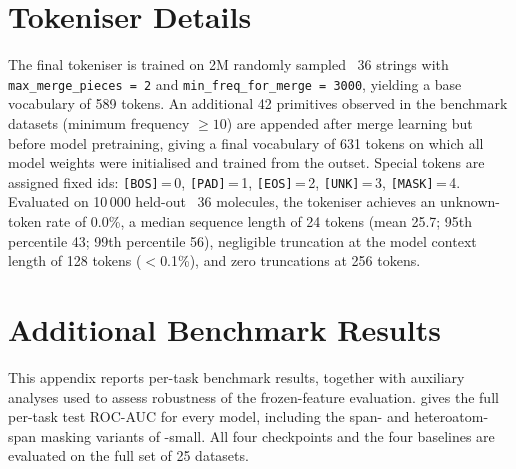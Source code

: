 \documentclass[11pt,a4paper]{article}
\begin{document}
\begin{appendices}
\FloatBarrier
\section{Tokeniser Details}%
\label{app:tokeniser}



The final tokeniser is trained on 2M randomly sampled \chembl{}~36
\selfies{} strings with \texttt{max\_merge\_pieces\,=\,2} and
\texttt{min\_freq\_for\_merge\,=\,3000}, yielding a base vocabulary of
589 tokens.
An additional 42 \selfies{} primitives observed in the benchmark datasets
(minimum frequency $\ge 10$) are appended after \ape{} merge learning but
before model pretraining, giving a final vocabulary of 631 tokens on which
all model weights were initialised and trained from the outset.
Special tokens are assigned fixed ids: \texttt{[BOS]}\,=\,0,
\texttt{[PAD]}\,=\,1, \texttt{[EOS]}\,=\,2, \texttt{[UNK]}\,=\,3,
\texttt{[MASK]}\,=\,4.
Evaluated on 10\,000 held-out \chembl{}~36 molecules, the tokeniser
achieves an unknown-token rate of 0.0\%, a median sequence length of 24
tokens (mean 25.7; 95th percentile 43; 99th percentile 56), negligible
truncation at the model context length of 128 tokens ($<$0.1\%), and zero
truncations at 256 tokens.

\FloatBarrier
\section{Additional Benchmark Results}%
\label{app:additional-results}

This appendix reports per-task benchmark results, together with
auxiliary analyses used to assess robustness of the frozen-feature evaluation.
 gives the full per-task test ROC-AUC for every model,
including the span- and heteroatom-span masking variants of \model{}-small.
All four \model{} checkpoints and the four baselines are evaluated on the
full set of 25 datasets.






\end{appendices}
\end{document}
